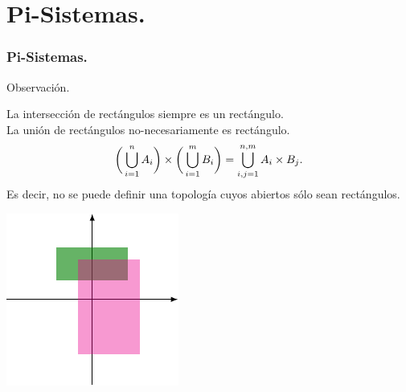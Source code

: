 \documentclass{beamer}
\begin{document}
\section{Pi-Sistemas.} %
\frame{\sectionpage}
\begin{frame}[t]
	\frametitle{Pi-Sistemas.}
	\begin{block}{Observación.}
		\begin{minipage}{0.5\linewidth}
			La intersección de rectángulos siempre es un rectángulo. \\[2mm]
			La unión de rectángulos no-necesariamente es rectángulo.
			\[
				\bigg(\displaystyle\bigcup_{i=1}^{n} A_i\bigg) \times \bigg(\displaystyle\bigcup_{i=1}^{m} B_i\bigg) = \displaystyle\bigcup_{i,j = 1}^{n,m} A_i \times B_j.
			\]
			Es decir, no se puede definir una topología cuyos abiertos sólo sean rectángulos.
		\end{minipage}\hspace{5mm}
		\begin{minipage}{0.4\linewidth}
			\includegraphics[width= \linewidth, page = 1]{IMAGENES/4_PI/1/tikz.pdf}
		\end{minipage}
	\end{block}
\end{frame}
\end{document}
